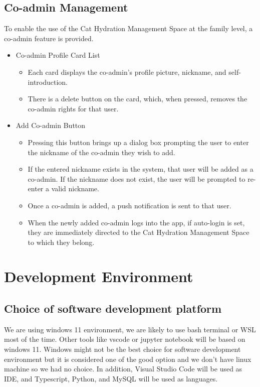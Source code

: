 \documentclass[conference]{IEEEtran}
\begin{document}
\subsection{Co-admin Management}
To enable the use of the Cat Hydration Management Space at the family level, a co-admin feature is provided.\newline
\begin{itemize}
\item Co-admin Profile Card List
    \begin{itemize}
        \item Each card displays the co-admin's profile picture, nickname, and self-introduction.
        \item There is a delete button on the card, which, when pressed, removes the co-admin rights for that user.
    \end{itemize}
\item Add Co-admin Button
    \begin{itemize}
        \item Pressing this button brings up a dialog box prompting the user to enter the nickname of the co-admin they wish to add.
        \item If the entered nickname exists in the system, that user will be added as a co-admin. If the nickname does not exist, the user will be prompted to re-enter a valid nickname.
        \item Once a co-admin is added, a push notification is sent to that user.
        \item When the newly added co-admin logs into the app, if auto-login is set, they are immediately directed to the Cat Hydration Management Space to which they belong.\\
    \end{itemize}
\end{itemize}

\newpage
\section{Development Environment}
\subsection{Choice of software development platform}
We are using windows 11 environment, we are likely to use bash terminal or WSL most of the time. Other tools like vscode or jupyter notebook will be based on windows 11. Windows might not be the best choice for software development environment but it is considered one of the good option and we don't have linux machine so we had no choice. In addition, Visual Studio Code will be used as IDE, and Typescript, Python, and MySQL will be used as languages.
\end{document}
